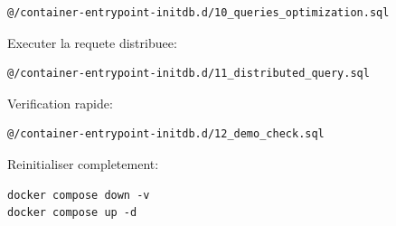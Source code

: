 \documentclass[12pt,a4paper]{report}
\begin{document}
\begin{lstlisting}[style=sqlstyle]
@/container-entrypoint-initdb.d/10_queries_optimization.sql
\end{lstlisting}

Executer la requete distribuee:

\begin{lstlisting}[style=sqlstyle]
@/container-entrypoint-initdb.d/11_distributed_query.sql
\end{lstlisting}

Verification rapide:

\begin{lstlisting}[style=sqlstyle]
@/container-entrypoint-initdb.d/12_demo_check.sql
\end{lstlisting}

Reinitialiser completement:

\begin{lstlisting}[style=textstyle]
docker compose down -v
docker compose up -d
\end{lstlisting}
\end{document}

